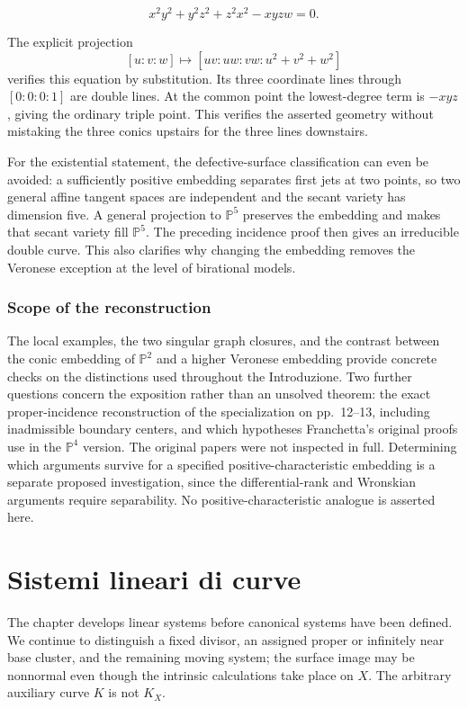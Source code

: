\[
x^2y^2+y^2z^2+z^2x^2-xyzw=0.
\]

The explicit projection \[
[u:v:w]\longmapsto[uv:uw:vw:u^2+v^2+w^2]
\] verifies this equation by substitution. Its three coordinate lines through \([0:0:0:1]\) are double lines. At the common point the lowest-degree term is \(-xyz\), giving the ordinary triple point. This verifies the asserted geometry without mistaking the three conics upstairs for the three lines downstairs.

For the existential statement, the defective-surface classification can even be avoided: a sufficiently positive embedding separates first jets at two points, so two general affine tangent spaces are independent and the secant variety has dimension five. A general projection to \(\mathbb P^5\) preserves the embedding and makes that secant variety fill \(\mathbb P^5\). The preceding incidence proof then gives an irreducible double curve. This also clarifies why changing the embedding removes the Veronese exception at the level of birational models.

\subsection{Scope of the reconstruction}

The local examples, the two singular graph closures, and the contrast between the conic embedding of \(\mathbb P^2\) and a higher Veronese embedding provide concrete checks on the distinctions used throughout the Introduzione. Two further questions concern the exposition rather than an unsolved theorem: the exact proper-incidence reconstruction of the specialization on pp.~12--13, including inadmissible boundary centers, and which hypotheses Franchetta's original proofs use in the \(\mathbb P^4\) version. The original papers were not inspected in full. Determining which arguments survive for a specified positive-characteristic embedding is a separate proposed investigation, since the differential-rank and Wronskian arguments require separability. No positive-characteristic analogue is asserted here.

\chapter{Sistemi lineari di curve}\label{enriques-I}

The chapter develops linear systems before canonical systems have been defined. We continue to distinguish a fixed divisor, an assigned proper or infinitely near base cluster, and the remaining moving system; the surface image may be nonnormal even though the intrinsic calculations take place on \(X\). The arbitrary auxiliary curve \(K\) is not \(K_X\).

